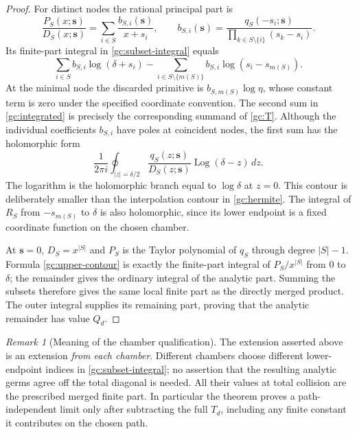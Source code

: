 \documentclass[11pt]{article}
\numberwithin{equation}{section}
\theoremstyle{definition}
\theoremstyle{remark}
\newtheorem{remark}[theorem]{Remark}
\begin{document}
\begin{proof}
For distinct nodes the rational principal part is
\[
 \frac{P_S(x;\boldsymbol{s})}{D_S(x;\boldsymbol{s})}
 =\sum_{i\in S}\frac{b_{S,i}(\boldsymbol{s})}{x+s_i},
 \qquad
 b_{S,i}(\boldsymbol{s})=
 \frac{q_S(-s_i;\boldsymbol{s})}
      {\prod_{k\in S\setminus\{i\}}(s_k-s_i)}.
\]
Its finite-part integral in \eqref{gc:subset-integral} equals
\begin{equation}\label{gc:integrated}
 \sum_{i\in S}b_{S,i}\log(\delta+s_i)
 -\sum_{i\in S\setminus\{m(S)\}}
       b_{S,i}\log(s_i-s_{m(S)}).
\end{equation}
At the minimal node the discarded primitive is $b_{S,m(S)}\log\eta$,
whose constant term is zero under the specified coordinate convention.
The second sum in \eqref{gc:integrated} is precisely the corresponding
summand of \eqref{gc:T}.  Although the individual coefficients $b_{S,i}$
have poles at coincident nodes, the first sum has the holomorphic form
\begin{equation}\label{gc:upper-contour}
 \frac1{2\pi i}\oint_{|z|=\delta/2}
 \frac{q_S(z;\boldsymbol{s})}{D_S(z;\boldsymbol{s})}
                      \operatorname{Log}(\delta-z)\,dz.
\end{equation}
The logarithm is the holomorphic branch equal to $\log\delta$ at $z=0$.
This contour is deliberately smaller than the interpolation contour in
\eqref{gc:hermite}.  The integral of $R_S$ from $-s_{m(S)}$ to $\delta$ is
also holomorphic, since its lower endpoint is a fixed coordinate function
on the chosen chamber.

At $\boldsymbol{s}=0$, $D_S=x^{|S|}$ and $P_S$ is the Taylor polynomial of
$q_S$ through degree $|S|-1$.  Formula \eqref{gc:upper-contour} is exactly
the finite-part integral of $P_S/x^{|S|}$ from $0$ to $\delta$; the
remainder gives the ordinary integral of the analytic part.  Summing the
subsets therefore gives the same local finite part as the directly
merged product.  The outer integral supplies its remaining part, proving
that the analytic remainder has value $Q_d$.
\end{proof}

\begin{remark}[Meaning of the chamber qualification]
The extension asserted above is an extension \emph{from each chamber}.
Different chambers choose different lower-endpoint indices in
\eqref{gc:subset-integral}; no assertion that the resulting analytic germs
agree off the total diagonal is needed.  All their values at total
collision are the prescribed merged finite part.  In particular the
theorem proves a path-independent limit only after subtracting the full
$T_d$, including any finite constant it contributes on the chosen path.
\end{remark}
\end{document}
